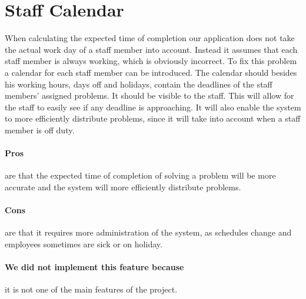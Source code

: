 \section{Staff Calendar}
\label{sec:staffCalendar}
When calculating the expected time of completion our application does not take the actual work day of a staff member into account. 
Instead it assumes that each staff member is always working, which is obviously incorrect. 
To fix this problem a calendar for each staff member can be introduced. 
The calendar should besides his working hours, days off and holidays, contain the deadlines of the staff members' assigned problems. 
It should be visible to the staff. 
This will allow for the staff to easily see if any deadline is approaching. 
It will also enable the system to more efficiently distribute problems, since it will take into account when a staff member is off duty. 

\paragraph{Pros} are that the expected time of completion of solving a problem will be more accurate and the system will more efficiently distribute problems.
\paragraph{Cons} are that it requires more administration of the system, as schedules change and employees sometimes are sick or on holiday.
\paragraph{We did not implement this feature because} it is not one of the main features of the project.